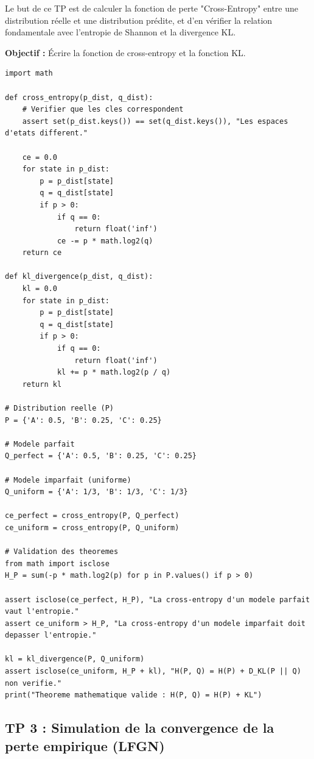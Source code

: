 \documentclass[11pt,a4paper]{article}
\begin{document}
Le but de ce TP est de calculer la fonction de perte "Cross-Entropy" entre une distribution réelle et une distribution prédite, et d'en vérifier la relation fondamentale avec l'entropie de Shannon et la divergence KL.

\textbf{Objectif :}
Écrire la fonction de cross-entropy et la fonction KL.

\begin{lstlisting}
import math

def cross_entropy(p_dist, q_dist):
    # Verifier que les cles correspondent
    assert set(p_dist.keys()) == set(q_dist.keys()), "Les espaces d'etats different."

    ce = 0.0
    for state in p_dist:
        p = p_dist[state]
        q = q_dist[state]
        if p > 0:
            if q == 0:
                return float('inf')
            ce -= p * math.log2(q)
    return ce

def kl_divergence(p_dist, q_dist):
    kl = 0.0
    for state in p_dist:
        p = p_dist[state]
        q = q_dist[state]
        if p > 0:
            if q == 0:
                return float('inf')
            kl += p * math.log2(p / q)
    return kl

# Distribution reelle (P)
P = {'A': 0.5, 'B': 0.25, 'C': 0.25}

# Modele parfait
Q_perfect = {'A': 0.5, 'B': 0.25, 'C': 0.25}

# Modele imparfait (uniforme)
Q_uniform = {'A': 1/3, 'B': 1/3, 'C': 1/3}

ce_perfect = cross_entropy(P, Q_perfect)
ce_uniform = cross_entropy(P, Q_uniform)

# Validation des theoremes
from math import isclose
H_P = sum(-p * math.log2(p) for p in P.values() if p > 0)

assert isclose(ce_perfect, H_P), "La cross-entropy d'un modele parfait vaut l'entropie."
assert ce_uniform > H_P, "La cross-entropy d'un modele imparfait doit depasser l'entropie."

kl = kl_divergence(P, Q_uniform)
assert isclose(ce_uniform, H_P + kl), "H(P, Q) = H(P) + D_KL(P || Q) non verifie."
print("Theoreme mathematique valide : H(P, Q) = H(P) + KL")
\end{lstlisting}


\subsection*{TP 3 : Simulation de la convergence de la perte empirique (LFGN) }
\end{document}
